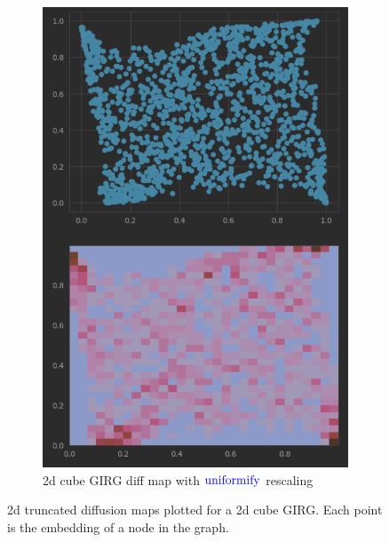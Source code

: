 \begin{figure}
\begin{subfigure}{0.45\textwidth}
      \includegraphics[width=\linewidth]{figures/diffmap_plot_uniformed.png}
      \caption{2d cube GIRG diff map with $\operatorname{\textcolor{blue}{uniformify}}$ rescaling}
      \label{fig:sub2}
    \end{subfigure}
    \caption{
      2d truncated diffusion maps plotted for a 2d cube GIRG. Each point is the embedding of a node in the graph.}
    \label{fig:diffmap_uniformed_vs_nonuniformed}

  \end{figure}


